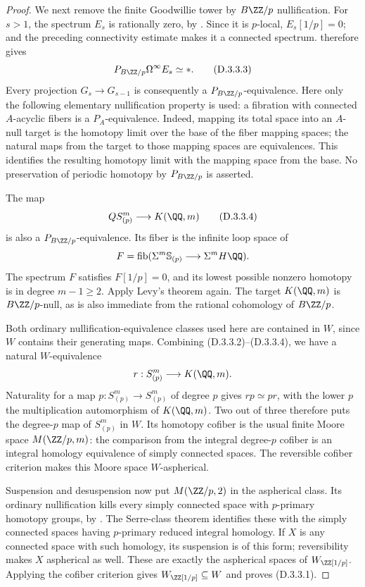\begin{proof}
We next remove the finite Goodwillie tower by $B\ZZ/p$
nullification. For $s>1$, the spectrum $E_s$ is rationally
zero, by \cite[Proposition~3.1]{EH5AroneMahowald1999}.
Since it is $p$-local, $E_s[1/p]=0$; and the preceding
connectivity estimate makes it a connected spectrum.
\cite[Theorem~3.2]{EH5Levy2025} therefore gives
\[
                    P_{B\ZZ/p}\Omega^\infty E_s\simeq *.
 \tag{D.3.3.3}
\]
Every projection $G_s\to G_{s-1}$ is consequently a
$P_{B\ZZ/p}$-equivalence. Here only the following elementary
nullification property is used: a fibration with connected
$A$-acyclic fibers is a $P_A$-equivalence. Indeed, mapping its
total space into an $A$-null target is the homotopy limit over
the base of the fiber mapping spaces; the natural maps from
the target to those mapping spaces are equivalences. This
identifies the resulting homotopy limit with the mapping space
from the base. No preservation of periodic homotopy by
$P_{B\ZZ/p}$ is asserted.

The map
\[
                 QS^m_{(p)}\longrightarrow K(\QQ,m)
 \tag{D.3.3.4}
\]
is also a $P_{B\ZZ/p}$-equivalence. Its fiber is the infinite
loop space of
\[
     F=\operatorname{fib}(\Sigma^m\mathbb S_{(p)}
                            \longrightarrow\Sigma^mH\QQ).
\]
The spectrum $F$ satisfies $F[1/p]=0$, and its lowest possible
nonzero homotopy is in degree $m-1\geq2$. Apply Levy's theorem
again. The target $K(\QQ,m)$ is $B\ZZ/p$-null, as is also
immediate from the rational cohomology of $B\ZZ/p$.

Both ordinary nullification-equivalence classes used here are
contained in $W$, since $W$ contains their generating maps.
Combining (D.3.3.2)--(D.3.3.4), we have a natural $W$-equivalence
\[
                         r:S^m_{(p)}\longrightarrow K(\QQ,m).
\]
Naturality for a map $p:S^m_{(p)}\to S^m_{(p)}$ of degree $p$
gives $r p\simeq p r$, with the lower $p$ the multiplication
automorphism of $K(\QQ,m)$. Two out of three therefore puts
the degree-$p$ map of $S^m_{(p)}$ in $W$. Its homotopy cofiber
is the usual finite Moore space $M(\ZZ/p,m)$: the comparison
from the integral degree-$p$ cofiber is an integral homology
equivalence of simply connected spaces. The reversible cofiber
criterion makes this Moore space $W$-aspherical.

Suspension and desuspension now put $M(\ZZ/p,2)$ in the
aspherical class. Its ordinary nullification kills every
simply connected space with $p$-primary homotopy groups, by
\cite[Theorem~7.5]{EH5Bousfield1997}. The Serre-class theorem
identifies these with the simply connected spaces having
$p$-primary reduced integral homology. If $X$ is any connected
space with such homology, its suspension is of this form;
reversibility makes $X$ aspherical as well. These are exactly
the aspherical spaces of $W_{\ZZ[1/p]}$. Applying the cofiber
criterion gives $W_{\ZZ[1/p]}\subseteq W$ and proves (D.3.3.1).
\end{proof}
